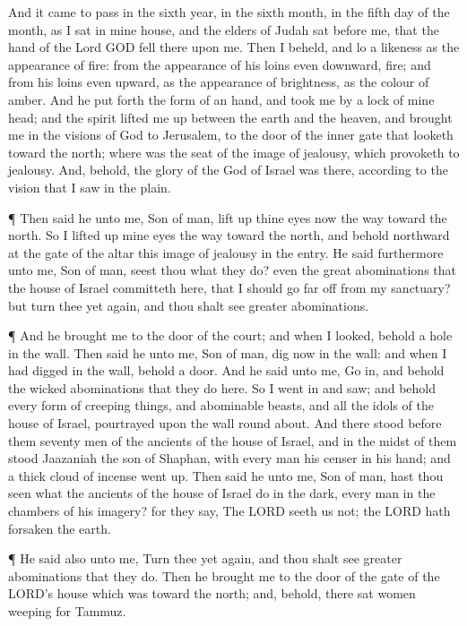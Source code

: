  And it came to pass in the sixth year, in the sixth month,
in the fifth day of the month, as I sat in mine house, and the elders of
Judah sat before me, that the hand of the Lord GOD fell there upon me.
 Then I beheld, and lo a likeness as the appearance of fire:
from the appearance of his loins even downward, fire; and from his loins
even upward, as the appearance of brightness, as the colour of amber.
 And he put forth the form of an hand, and took me by a lock
of mine head; and the spirit lifted me up between the earth and the
heaven, and brought me in the visions of God to Jerusalem, to the door
of the inner gate that looketh toward the north; where was the seat of
the image of jealousy, which provoketh to jealousy.  And,
behold, the glory of the God of Israel was there, according to the
vision that I saw in the plain.

 ¶ Then said he unto me, Son of man, lift up thine eyes now
the way toward the north. So I lifted up mine eyes the way toward the
north, and behold northward at the gate of the altar this image of
jealousy in the entry.  He said furthermore unto me, Son of
man, seest thou what they do? even the great abominations that the house
of Israel committeth here, that I should go far off from my sanctuary?
but turn thee yet again, and thou shalt see greater abominations.

 ¶ And he brought me to the door of the court; and when I
looked, behold a hole in the wall.  Then said he unto me,
Son of man, dig now in the wall: and when I had digged in the wall,
behold a door.  And he said unto me, Go in, and behold the
wicked abominations that they do here.  So I went in and
saw; and behold every form of creeping things, and abominable beasts,
and all the idols of the house of Israel, pourtrayed upon the wall round
about.  And there stood before them seventy men of the
ancients of the house of Israel, and in the midst of them stood
Jaazaniah the son of Shaphan, with every man his censer in his hand; and
a thick cloud of incense went up.  Then said he unto me,
Son of man, hast thou seen what the ancients of the house of Israel do
in the dark, every man in the chambers of his imagery? for they say, The
LORD seeth us not; the LORD hath forsaken the earth.

 ¶ He said also unto me, Turn thee yet again, and thou
shalt see greater abominations that they do.  Then he
brought me to the door of the gate of the LORD's house which was toward
the north; and, behold, there sat women weeping for Tammuz.


